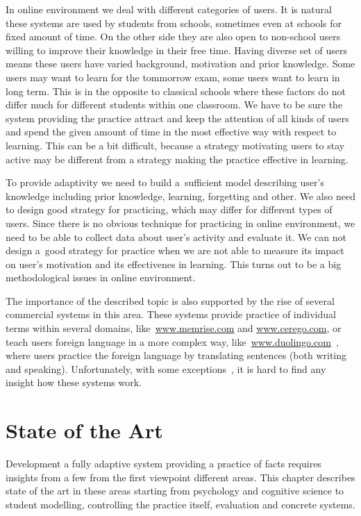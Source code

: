 \documentclass[table,color]{fithesis3/fithesis3}
\begin{document}
In online environment we deal with different categories of users. It is natural
these systems are used by students from schools, sometimes even at schools for
fixed amount of time. On the other side they are also open to non-school users
willing to improve their knowledge in their free time. Having diverse set of
users means these users have varied background, motivation and prior knowledge.
Some users may want to learn for the tommorrow exam, some users want to learn
in long term. This is in the opposite to classical schools where these factors
do not differ much for different students within one classroom. We have to be
sure the system providing the practice attract and keep the attention of all
kinds of users and spend the given amount of time in the most effective way
with respect to learning.  This can be a bit difficult, because a strategy
motivating users to stay active may be different from a strategy making the
practice effective in learning.

To provide adaptivity we need to build a~sufficient model describing user's
knowledge including prior knowledge, learning, forgetting and other. We also
need to design good strategy for practicing, which may differ for different
types of users. Since there is no obvious technique for practicing in online
environment, we need to be able to collect data about user's activity and
evaluate it. We can not design a~good strategy for practice when we are not
able to measure its impact on user's motivation and its effectivenes in
learning. This turns out to be a big methodological issues in online
environment.

The importance of the described topic is also supported by the rise of several
commercial systems in this area. These systems provide practice of individual
terms within several domains, like~\url{www.memrise.com} and
\url{www.cerego.com}, or teach users foreign language in a more complex way,
like~\url{www.duolingo.com}~\cite{garcia2013learning}, where users practice the foreign language by
translating sentences (both writing and speaking). Unfortunately, with some
exceptions~\cite{streeter2015mixture}, it is hard to find any insight how these
systems work.

\chapter{State of the Art}

Development a fully adaptive system providing a practice of facts requires
insights from a few from the first viewpoint different areas. This chapter
describes state of the art in these areas starting from psychology and
cognitive science to student modelling, controlling the practice itself,
evaluation and concrete systems.
\end{document}

